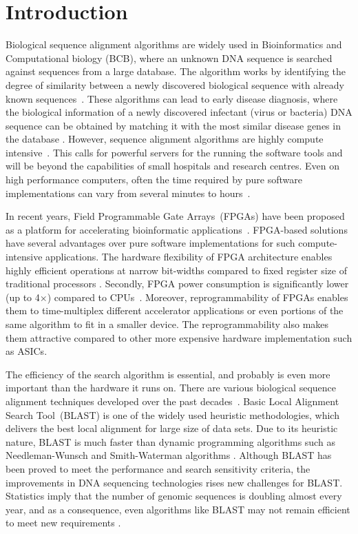 \section{Introduction}
\label{sec:introduction}

Biological sequence alignment algorithms are widely used in Bioinformatics and Computational biology (BCB), where an unknown DNA sequence is searched against sequences from a large database. 
The algorithm works by identifying the degree of similarity between a newly discovered biological sequence with already known sequences~\cite{kasap2008design}.
These algorithms can lead to early disease diagnosis, where the biological information of a newly discovered infectant (virus or bacteria) DNA sequence can be obtained by matching it with the most similar disease genes in the database \cite{guo2012systolic}. 
However, sequence alignment algorithms are highly compute intensive~\cite{datta2009}. 
This calls for powerful servers for the running the software tools and will be beyond the capabilities of small hospitals and research centres.
Even on high performance computers, often the time required by pure software implementations can vary from several minutes to hours~\cite{masato2016}.  

In recent years, Field Programmable Gate Arrays~(FPGAs) have been proposed as a platform for accelerating bioinformatic applications~\cite{kasap2008design}. 
FPGA-based solutions have several advantages over pure software implementations for such compute-intensive applications.
The hardware flexibility of FPGA architecture enables highly efficient operations at narrow bit-widths compared to fixed register size of traditional processors \cite{cug2007}. 
Secondly, FPGA power consumption is significantly lower (up to 4$\times$) compared to CPUs~\cite{cug2007}. 
Moreover, reprogrammability of FPGAs enables them to time-multiplex different accelerator applications or even portions of the same algorithm to fit in a smaller device. 
The reprogrammability also makes them attractive compared to other more expensive hardware implementation such as ASICs. 

The efficiency of the search algorithm is essential, and probably is even more important than the hardware it runs on. 
There are various biological sequence alignment techniques developed over the past decades~\cite{mohd2013}. 
Basic Local Alignment Search Tool~(BLAST) is one of the widely used heuristic methodologies, which delivers the best local alignment for large size of data sets. 
Due to its heuristic nature, BLAST is much faster than dynamic programming algorithms such as Needleman-Wunsch and Smith-Waterman algorithms \cite{wien2011blastp}. 
Although BLAST has been proved to meet the performance and search sensitivity criteria, the improvements in DNA sequencing technologies rises new challenges for BLAST. 
Statistics imply that the number of genomic sequences is doubling almost every year, and as a consequence, even algorithms like BLAST may not remain efficient to meet new requirements \cite{wien2011blastp}. 

